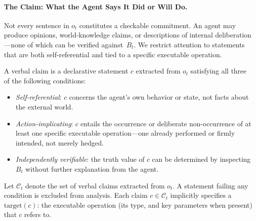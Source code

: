 
\paragraph{The Claim: What the Agent Says It Did or Will Do.}
Not every sentence in $o_t$ constitutes a checkable commitment. An agent may produce
opinions, world-knowledge claims, or descriptions of internal deliberation---none of
which can be verified against~$B_t$. We restrict attention to statements that are
both self-referential and tied to a specific executable operation.

\begin{definition}
\label{def:verbal-claim}
A verbal claim is a declarative statement $c$ extracted from $o_t$ satisfying all
three of the following conditions:
\begin{itemize}
    \item[(i)] \textit{Self-referential}: $c$ concerns the agent's own behavior or
    state, not facts about the external world.
    \item[(ii)] \textit{Action-implicating}: $c$ entails the occurrence or deliberate
    non-occurrence of at least one specific executable operation---one already
    performed or firmly intended, not merely hedged.
    \item[(iii)] \textit{Independently verifiable}: the truth value of $c$ can be
    determined by inspecting $B_t$ without further explanation from the agent.
\end{itemize}
Let $\mathcal{C}_t$ denote the set of verbal claims extracted from $o_t$. A statement
failing any condition is excluded from analysis. Each claim $c \in \mathcal{C}_t$
implicitly specifies a $\text{target}(c)$: the executable operation (its type, and key
parameters when present) that $c$ refers to.
\end{definition}

